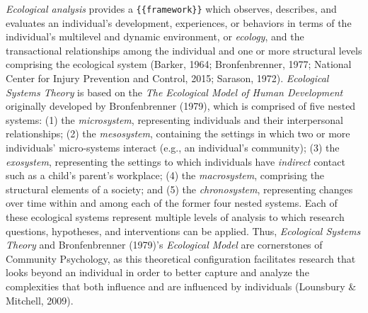 \documentclass[11pt,]{tufte-book}
\begin{document}
\emph{Ecological analysis} provides a \texttt{\{\{framework\}\}} which
observes, describes, and evaluates an individual's development,
experiences, or behaviors in terms of the individual's multilevel and
dynamic environment, or \emph{ecology}, and the transactional
relationships among the individual and one or more structural levels
comprising the ecological system (Barker, 1964; Bronfenbrenner, 1977;
National Center for Injury Prevention and Control, 2015; Sarason, 1972).
\emph{Ecological Systems Theory} is based on the \emph{The Ecological
Model of Human Development} originally developed by Bronfenbrenner
(1979), which is comprised of five nested systems: (1) the
\emph{microsystem}, representing individuals and their interpersonal
relationships; (2) the \emph{mesosystem}, containing the settings in
which two or more individuals' micro-systems interact (e.g., an
individual's community); (3) the \emph{exosystem}, representing the
settings to which individuals have \emph{indirect} contact such as a
child's parent's workplace; (4) the \emph{macrosystem}, comprising the
structural elements of a society; and (5) the \emph{chronosystem},
representing changes over time within and among each of the former four
nested systems. Each of these ecological systems represent multiple
levels of analysis to which research questions, hypotheses, and
interventions can be applied. Thus, \emph{Ecological Systems Theory} and
Bronfenbrenner (1979)'s \emph{Ecological Model} are cornerstones of
Community Psychology, as this theoretical configuration facilitates
research that looks beyond an individual in order to better capture and
analyze the complexities that both influence and are influenced by
individuals (Lounsbury \& Mitchell, 2009).
\end{document}
